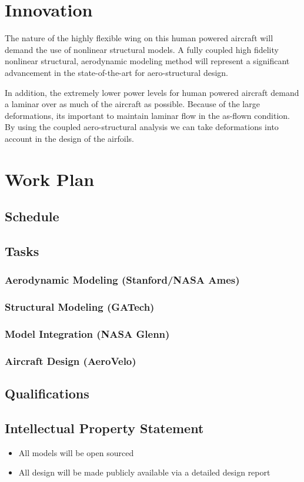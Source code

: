 \documentclass[]{aiaa-tc}
\begin{document}
  \section{Innovation}
    The nature of the highly flexible wing on this human powered aircraft will demand the use 
    of nonlinear structural models. A fully coupled high fidelity nonlinear structural, aerodynamic modeling method 
    will represent a significant advancement in the state­-of-­the-­art for aero­-structural design. 

    In addition, the extremely lower power levels for human powered aircraft demand a laminar over as much of 
    the aircraft as possible. Because of the large deformations, its important to maintain laminar flow in the 
    as-flown condition. By using the coupled aero-structural analysis we can take deformations into account in the design 
    of the airfoils. 

  \section{Work Plan}
    \subsection{Schedule}
    \subsection{Tasks}
        \subsubsection{Aerodynamic Modeling (Stanford/NASA Ames)}
        \subsubsection{Structural Modeling (GATech)}
        \subsubsection{Model Integration (NASA Glenn)}
        \subsubsection{Aircraft Design (AeroVelo)}

    \subsection{Qualifications}
    \subsection{Intellectual Property Statement}
        \begin{itemize}
            \item All models will be open sourced
            \item All design will be made publicly available via a detailed design report
        \end{itemize}
\end{document}
